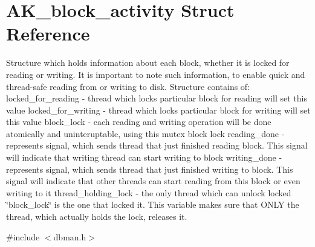 \hypertarget{structAK__block__activity}{\section{A\+K\+\_\+block\+\_\+activity Struct Reference}
\label{structAK__block__activity}
}


Structure which holds information about each block, whether it is locked for reading or writing. It is important to note such information, to enable quick and thread-\/safe reading from or writing to disk. Structure contains of\+: locked\+\_\+for\+\_\+reading -\/ thread which locks particular block for reading will set this value locked\+\_\+for\+\_\+writing -\/ thread which locks particular block for writing will set this value block\+\_\+lock -\/ each reading and writing operation will be done atomically and uninteruptable, using this mutex block lock reading\+\_\+done -\/ represents signal, which sends thread that just finished reading block. This signal will indicate that writing thread can start writing to block writing\+\_\+done -\/ represents signal, which sends thread that just finished writing to block. This signal will indicate that other threads can start reading from this block or even writing to it thread\+\_\+holding\+\_\+lock -\/ the only thread which can unlock locked \char`\"{}block\+\_\+lock\char`\"{} is the one that locked it. This variable makes sure that O\+N\+L\+Y the thread, which actually holds the lock, releases it.  




{\ttfamily \#include $<$dbman.\+h$>$}

